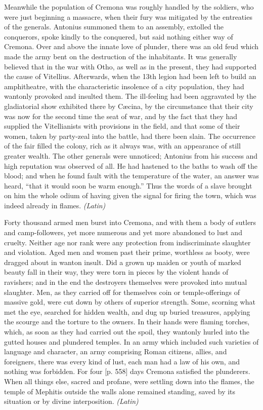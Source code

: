 Meanwhile the population of Cremona was roughly handled by the soldiers, who were just beginning a massacre, when their fury was mitigated by the entreaties of the generals. Antonius summoned them to an assembly, extolled the conquerors, spoke kindly to the conquered, but said nothing either way of Cremona. Over and above the innate love of plunder, there was an old feud which made the army bent on the destruction of the inhabitants. It was generally believed that in the war with Otho, as well as in the present, they had supported the cause of Vitellius. Afterwards, when the 13th legion had been left to build an amphitheatre, with the characteristic insolence of a city population, they had wantonly provoked and insulted them. The ill-feeling had been aggravated by the gladiatorial show exhibited there by Cæcina, by the circumstance that their city was now for the second time the seat of war, and by the fact that they had supplied the Vitellianists with provisions in the field, and that some of their women, taken by party-zeal into the battle, had there been slain. The occurrence of the fair filled the colony, rich as it always was, with an appearance of still greater wealth. The other generals were unnoticed; Antonius from his success and high reputation was observed of all. He had hastened to the baths to wash off the blood; and when he found fault with the temperature of the water, an answer was heard, ``that it would soon be warm enough.'' Thus the words of a slave brought on him the whole odium of having given the signal for firing the town, which was indeed already in flames. \emph{(Latin)}


Forty thousand armed men burst into Cremona, and with them a body of sutlers and camp-followers, yet more numerous and yet more abandoned to lust and cruelty. Neither age nor rank were any protection from indiscriminate slaughter and violation. Aged men and women past their prime, worthless as booty, were dragged about in wanton insult. Did a grown up maiden or youth of marked beauty fall in their way, they were torn in pieces by the violent hands of ravishers; and in the end the destroyers themselves were provoked into mutual slaughter. Men, as they carried off for themselves coin or temple-offerings of massive gold, were cut down by others of superior strength. Some, scorning what met the eye, searched for hidden wealth, and dug up buried treasures, applying the scourge and the torture to the owners. In their hands were flaming torches, which, as soon as they had carried out the spoil, they wantonly hurled into the gutted houses and plundered temples. In an army which included such varieties of language and character, an army comprising Roman citizens, allies, and foreigners, there was every kind of lust, each man had a law of his own, and nothing was forbidden. For four [p. 558] days Cremona satisfied the plunderers. When all things else, sacred and profane, were settling down into the flames, the temple of Mephitis outside the walls alone remained standing, saved by its situation or by divine interposition. \emph{(Latin)}

